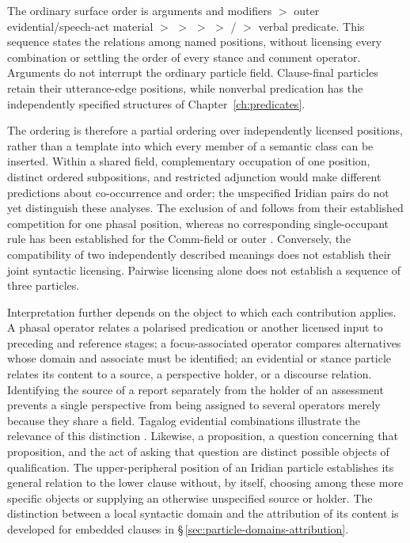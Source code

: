 \noindent The ordinary surface order is arguments and modifiers $>$ outer
 evidential/speech-act material $>$  $>$  $>$ 
 $>$ / $>$ verbal predicate. This sequence states the
 relations among named positions, without licensing every combination or
 settling the order of every stance and comment operator. Arguments do not
 interrupt the ordinary particle field. Clause-final particles retain their
 utterance-edge positions, while nonverbal predication has the independently
 specified structures of Chapter~\ref{ch:predicates}.

The ordering is therefore a partial ordering over independently licensed
positions, rather than a template into which every member of a semantic class
can be inserted. Within a shared field, complementary occupation of one
position, distinct ordered subpositions, and restricted adjunction would make
different predictions about co-occurrence and order; the unspecified Iridian
pairs do not yet distinguish these analyses. The exclusion of 
and  follows from their established competition for one phasal
position, whereas no corresponding single-occupant rule has been established
for the Comm-field or outer . Conversely, the compatibility of
two independently described meanings does not establish their joint syntactic
licensing. Pairwise licensing alone does not establish a sequence of three
particles.

Interpretation further depends on the object to which each contribution
applies. A phasal operator relates a polarised predication or another licensed
input to preceding and reference stages; a focus-associated operator compares
alternatives whose domain and associate must be identified; an evidential or
stance particle relates its content to a source, a perspective holder, or a
discourse relation. Identifying the source of a report separately from the
holder of an assessment prevents a single perspective from being assigned to
several operators merely because they share a field. Tagalog evidential
combinations illustrate the relevance of this distinction
\cite[§3.3.2.2]{tanalmazan2019}. Likewise, a proposition, a
question concerning that proposition, and the act of asking that question
are distinct possible objects of qualification. The upper-peripheral position
of an Iridian particle establishes its general relation to the lower clause
without, by itself, choosing among these more specific objects or supplying
an otherwise unspecified source or holder. The distinction between a local
syntactic domain and the attribution of its content is developed for embedded
clauses in §\,\ref{sec:particle-domains-attribution}.

